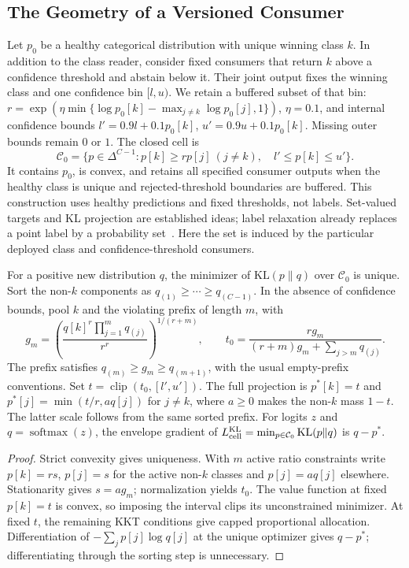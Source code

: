 \subsection{The Geometry of a Versioned Consumer}\label{app:consumer_cell_geometry}

Let $p_0$ be a healthy categorical distribution with unique winning class $k$.
In addition to the class reader, consider fixed consumers that return $k$ above
a confidence threshold and abstain below it. Their joint output fixes the
winning class and one confidence bin $[l,u)$. We retain a buffered subset of
that bin: $r=\exp(\eta\min\{\log p_0[k]-\max_{j\ne k}\log p_0[j],1\})$,
$\eta=0.1$, and internal confidence bounds
$l'=0.9l+0.1p_0[k]$, $u'=0.9u+0.1p_0[k]$. Missing outer bounds remain $0$ or $1$.
The closed cell is
\begin{equation}
\mathcal C_0=\{p\in\Delta^{C-1}:p[k]\ge r p[j]\ (j\ne k),\quad l'\le p[k]\le u'\}.
\end{equation}
It contains $p_0$, is convex, and retains all specified consumer outputs when
the healthy class is unique and rejected-threshold boundaries are buffered.
This construction uses healthy predictions and fixed thresholds, not labels.
Set-valued targets and KL projection are established ideas; label relaxation
already replaces a point label by a probability set~\citep{lienen2021labelrelaxation}. Here the set is induced
by the particular deployed class and confidence-threshold consumers.

\begin{proposition}\label{prop:consumer_cell_projection}
For a positive new distribution $q$, the minimizer of $\mathrm{KL}(p\|q)$ over
$\mathcal C_0$ is unique. Sort the non-$k$ components as
$q_{(1)}\ge\cdots\ge q_{(C-1)}$. In the absence of confidence bounds, pool $k$
and the violating prefix of length $m$, with
\begin{equation}
g_m=\left(\frac{q[k]^r\prod_{j=1}^m q_{(j)}}{r^r}\right)^{1/(r+m)},\qquad
t_0=\frac{r g_m}{(r+m)g_m+\sum_{j>m}q_{(j)}}.
\end{equation}
The prefix satisfies $q_{(m)}\ge g_m\ge q_{(m+1)}$, with the usual empty-prefix
conventions. Set $t=\operatorname{clip}(t_0,[l',u'])$. The full projection is
$p^*[k]=t$ and $p^*[j]=\min(t/r,a q[j])$ for $j\ne k$, where $a\ge0$ makes
the non-$k$ mass $1-t$. The latter scale follows from the same sorted prefix.
For logits $z$ and $q=\operatorname{softmax}(z)$, the envelope gradient of
$L_{\rm cell}^{\rm KL}=\min_{p\in\mathcal C_0}\mathrm{KL}(p\|q)$ is $q-p^*$.
\end{proposition}
\begin{proof}
Strict convexity gives uniqueness. With $m$ active ratio constraints write
$p[k]=rs$, $p[j]=s$ for the active non-$k$ classes and $p[j]=a q[j]$ elsewhere.
Stationarity gives $s=a g_m$; normalization yields $t_0$. The value function
at fixed $p[k]=t$ is convex, so imposing the interval clips its unconstrained
minimizer. At fixed $t$, the remaining KKT conditions give capped proportional
allocation. Differentiation of $-\sum_jp[j]\log q[j]$ at the unique optimizer
gives $q-p^*$; differentiating through the sorting step is unnecessary.
\end{proof}

